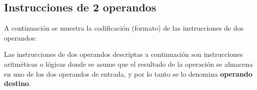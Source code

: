 \subsection{Instrucciones de 2 operandos}

A continuación se muestra la codificación (formato) de las instrucciones de dos operandos:



Las instrucciones de dos operandos descriptas a continuación son instrucciones aritméticas o lógicas donde se asume que el resultado de la operación se almacena en uno de los dos operandos de entrada, y por lo tanto se lo denomina \textbf{operando destino}.

